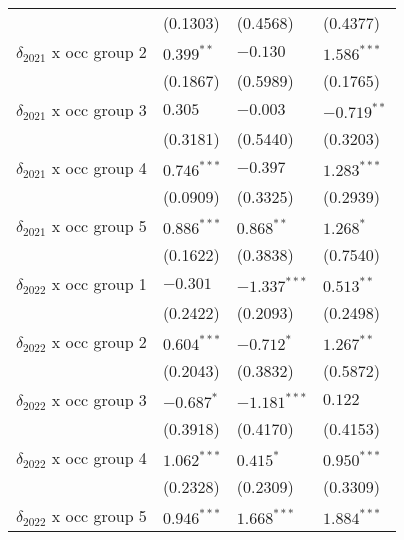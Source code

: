 \begin{tabular}{llll}
                                         &           (0.1303) &           (0.4568) &           (0.4377) \\
$\delta_{2021}$ x occ group 2            &       $0.399^{**}$ &           $-0.130$ &      $1.586^{***}$ \\
                                         &           (0.1867) &           (0.5989) &           (0.1765) \\
$\delta_{2021}$ x occ group 3            &            $0.305$ &           $-0.003$ &      $-0.719^{**}$ \\
                                         &           (0.3181) &           (0.5440) &           (0.3203) \\
$\delta_{2021}$ x occ group 4            &      $0.746^{***}$ &           $-0.397$ &      $1.283^{***}$ \\
                                         &           (0.0909) &           (0.3325) &           (0.2939) \\
$\delta_{2021}$ x occ group 5            &      $0.886^{***}$ &       $0.868^{**}$ &          $1.268^*$ \\
                                         &           (0.1622) &           (0.3838) &           (0.7540) \\
$\delta_{2022}$ x occ group 1            &           $-0.301$ &     $-1.337^{***}$ &       $0.513^{**}$ \\
                                         &           (0.2422) &           (0.2093) &           (0.2498) \\
$\delta_{2022}$ x occ group 2            &      $0.604^{***}$ &         $-0.712^*$ &       $1.267^{**}$ \\
                                         &           (0.2043) &           (0.3832) &           (0.5872) \\
$\delta_{2022}$ x occ group 3            &         $-0.687^*$ &     $-1.181^{***}$ &            $0.122$ \\
                                         &           (0.3918) &           (0.4170) &           (0.4153) \\
$\delta_{2022}$ x occ group 4            &      $1.062^{***}$ &          $0.415^*$ &      $0.950^{***}$ \\
                                         &           (0.2328) &           (0.2309) &           (0.3309) \\
$\delta_{2022}$ x occ group 5            &      $0.946^{***}$ &      $1.668^{***}$ &      $1.884^{***}$ \\

\end{tabular}

